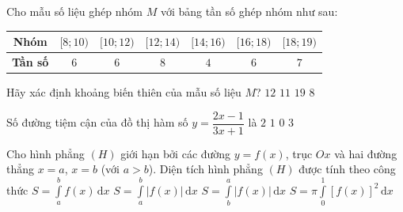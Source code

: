 \begin{ex}%
	Cho mẫu số liệu ghép nhóm $M$ với bảng tần số ghép nhóm như sau:
	\begin{center}
		\begin{tabular}{|c|c|c|c|c|c|c|}
			\hline
			\textbf{Nhóm} & $[8;10)$ & $[10;12)$ & $[12;14)$ & $[14;16)$ & $[16;18)$ & $[18;19)$ \\
			\hline
			\textbf{Tần số} & $6$ & $6$ & $8$ & $4$ & $6$ & $7$ \\
			\hline
		\end{tabular}
	\end{center}
	Hãy xác định khoảng biến thiên của mẫu số liệu $M$?
	\choice
	{$12$}
	{\True $11$}
	{$19$}
	{$8$}
\end{ex}

\begin{ex}%
	Số đường tiệm cận của đồ thị hàm số $y = \dfrac{2x-1}{3x+1}$ là
	\choice
	{\True $2$}
	{$1$}
	{$0$}
	{$3$}
\end{ex}

\begin{ex}%
	Cho hình phẳng $(H)$ giới hạn bởi các đường $y=f(x)$, trục $Ox$ và hai đường thẳng $x=a$, $x=b$ (với $a>b$). Diện tích hình phẳng $(H)$ được tính theo công thức
	\choice
	{$S=\displaystyle\int\limits_a^b f(x) \mathrm{\,d}x$}
	{$S=\displaystyle\int\limits_a^b \left|f(x)\right| \mathrm{\,d}x$}
	{\True $S=\displaystyle\int\limits_b^a \left|f(x)\right| \mathrm{\,d}x$}
	{$S=\pi \displaystyle\int\limits_0^1 \left[f(x)\right]^2 \mathrm{\,d}x$}
\end{ex}


